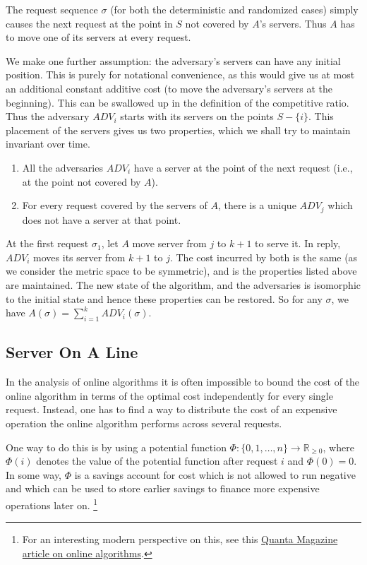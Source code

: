 \documentclass[14pt]{extreport}
\begin{document}
    \vspace{5mm}
    The request sequence \(\sigma\) (for both the deterministic and randomized cases) simply causes the next request at the point in \(S\) not covered by \(A\)'s servers. Thus \(A\) has to move one of its servers at every request.
    
    \vspace{5mm}
    We make one further assumption: the adversary's servers can have any initial position. This is purely for notational convenience, as this would give us at most an additional constant additive cost (to move the adversary's servers at the beginning). This can be swallowed up in the definition of the competitive ratio. Thus the adversary \(ADV_i\) starts with its servers on the points \(S - \{i\}\). This placement of the servers gives us two properties, which we shall try to maintain invariant over time.
    
    \begin{enumerate}
        \item All the adversaries \(ADV_i\) have a server at the point of the next request (i.e., at the point not covered by \(A\)).
        \item For every request covered by the servers of \(A\), there is a unique \(ADV_j\) which does not have a server at that point.
    \end{enumerate}
    
    At the first request \(\sigma_1\), let \(A\) move server from \(j\) to \(k+1\) to serve it. In reply, \(ADV_i\) moves its server from \(k+1\) to \(j\). The cost incurred by both is the same (as we consider the metric space to be symmetric), and is the properties listed above are maintained. The new state of the algorithm, and the adversaries is isomorphic to the initial state and hence these properties can be restored. So for any \(\sigma\), we have \(A(\sigma) = \sum_{i=1}^{k} ADV_i(\sigma)\).

\subsection*{Server On A Line}

In the analysis of online algorithms it is often impossible to bound the cost of the online algorithm in terms of the optimal cost independently for every single request. Instead, one has to find a way to distribute the cost of an expensive operation the online algorithm performs across several requests.

\vspace{5mm}
One way to do this is by using a potential function $\Phi : \{0, 1, \ldots, n\} \rightarrow \mathbb{R}_{\geq 0}$, where $\Phi(i)$ denotes the value of the potential function after request $i$ and $\Phi(0) = 0$. In some way, $\Phi$ is a savings account for cost which is not allowed to run negative and which can be used to store earlier savings to finance more expensive operations later on.
\footnote{For an interesting modern perspective on this, see this \href{https://www.quantamagazine.org/researchers-refute-a-widespread-belief-about-online-algorithms-20231120/}{Quanta Magazine article on online algorithms}.}
\end{document}
